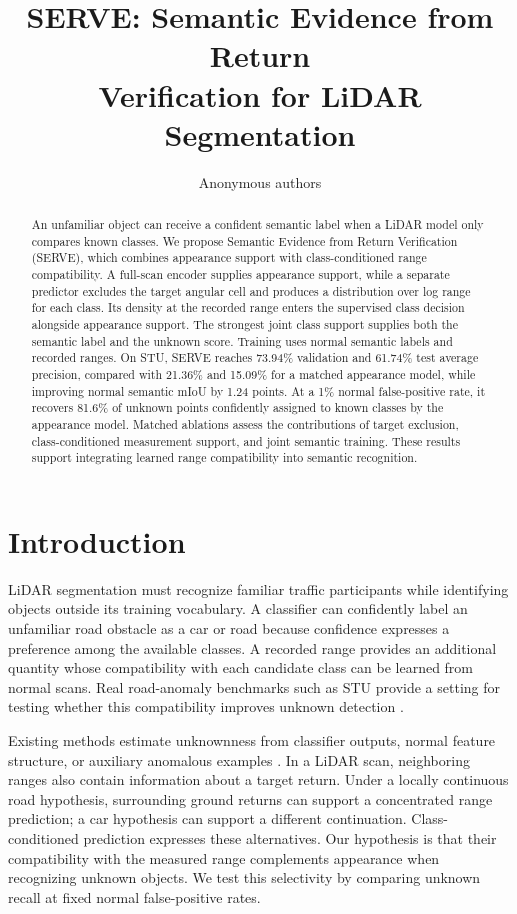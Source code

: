 \documentclass{article}
\title{SERVE: Semantic Evidence from Return\\Verification for LiDAR Segmentation}
\author{Anonymous authors}
\begin{document}
\maketitle

\begin{abstract}
An unfamiliar object can receive a confident semantic label when a LiDAR model only compares known classes. We propose Semantic Evidence from Return Verification (SERVE), which combines appearance support with class-conditioned range compatibility. A full-scan encoder supplies appearance support, while a separate predictor excludes the target angular cell and produces a distribution over log range for each class. Its density at the recorded range enters the supervised class decision alongside appearance support. The strongest joint class support supplies both the semantic label and the unknown score. Training uses normal semantic labels and recorded ranges. On STU, SERVE reaches 73.94\% validation and 61.74\% test average precision, compared with 21.36\% and 15.09\% for a matched appearance model, while improving normal semantic mIoU by 1.24 points. At a 1\% normal false-positive rate, it recovers 81.6\% of unknown points confidently assigned to known classes by the appearance model. Matched ablations assess the contributions of target exclusion, class-conditioned measurement support, and joint semantic training. These results support integrating learned range compatibility into semantic recognition.
\end{abstract}

\section{Introduction}
LiDAR segmentation must recognize familiar traffic participants while identifying objects outside its training vocabulary. A classifier can confidently label an unfamiliar road obstacle as a car or road because confidence expresses a preference among the available classes. A recorded range provides an additional quantity whose compatibility with each candidate class can be learned from normal scans. Real road-anomaly benchmarks such as STU provide a setting for testing whether this compatibility improves unknown detection \citep{stu}.

Existing methods estimate unknownness from classifier outputs, normal feature structure, or auxiliary anomalous examples \citep{energy,pixood,lido,ndp}. In a LiDAR scan, neighboring ranges also contain information about a target return. Under a locally continuous road hypothesis, surrounding ground returns can support a concentrated range prediction; a car hypothesis can support a different continuation. Class-conditioned prediction expresses these alternatives. Our hypothesis is that their compatibility with the measured range complements appearance when recognizing unknown objects. We test this selectivity by comparing unknown recall at fixed normal false-positive rates.
\end{document}
